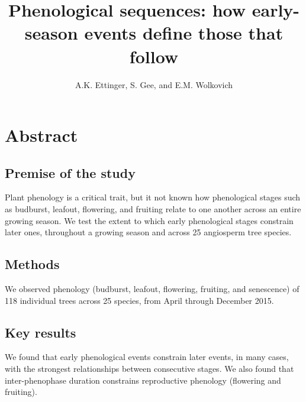 \documentclass{article}
\begin{document}

\title{Phenological sequences: how early-season events define those that follow} %
\author{A.K. Ettinger, S. Gee, and E.M. Wolkovich}
\maketitle  %


\section*{Abstract}
\subsection*{Premise of the study}
Plant phenology is a critical trait, but it not known how phenological stages such as budburst, leafout, flowering, and fruiting relate to one another across an entire growing season. We test the extent to which early phenological stages constrain later ones, throughout a growing season and across 25 angiosperm tree species. 
\subsection*{Methods}
We observed phenology (budburst, leafout, flowering, fruiting, and senescence) of 118 individual trees across 25 species, from April through December 2015. 
\subsection*{Key results}
We found that early phenological events constrain later events, in many cases, with the strongest relationships between consecutive stages. We also found that inter-phenophase duration constrains reproductive phenology (flowering and fruiting).
\end{document}
